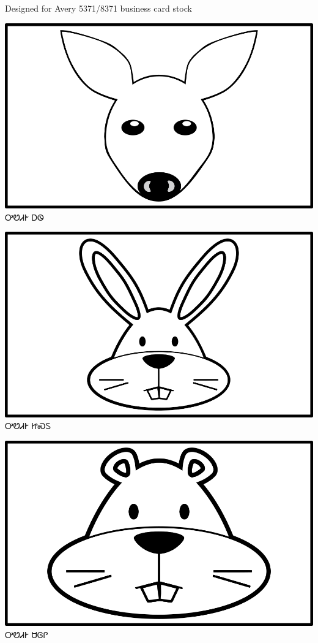 \documentclass[avery5371]{flashcards}%
\begin{document}
Designed for Avery 5371/8371 business card stock

\begin{flashcard}{
\includegraphics[width=0.95\columnwidth,height=.51\columnwidth,keepaspectratio]{../artwork/objects-animate/ahwi}
}\Huge ᎤᏬᏗᎨ ᎠᏫ
\end{flashcard}

\begin{flashcard}{
\includegraphics[width=0.95\columnwidth,height=.51\columnwidth,keepaspectratio]{../artwork/objects-animate/jisdu}
}\Huge ᎤᏬᏗᎨ ᏥᏍᏚ
\end{flashcard}

\begin{flashcard}{
\includegraphics[width=0.95\columnwidth,height=.51\columnwidth,keepaspectratio]{../artwork/objects-animate/saloli}
}\Huge ᎤᏬᏗᎨ ᏌᎶᎵ
\end{flashcard}
\end{document}
